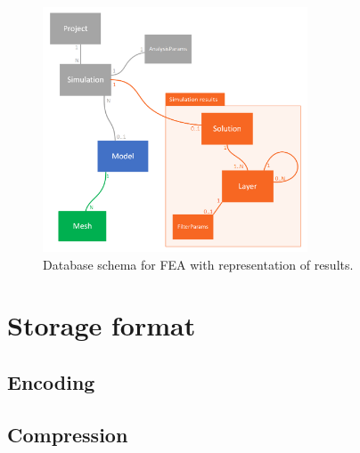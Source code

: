 \begin{figure}[H]
    \centering
    \includegraphics[width=0.7\textwidth]{figures/FEA-database-schema-with-results}
    \decoRule
    \caption{Database schema for FEA with representation of results.}
    \label{fig:FEA-db-schema-results}
\end{figure}

\section{Storage format}
\label{sec:storage-format}




\subsection {Encoding}

\subsection {Compression}

